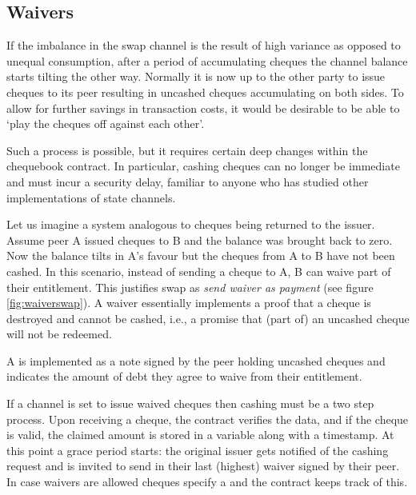 \subsection{Waivers}

If the imbalance in the swap channel is the result of high variance as opposed to unequal consumption, after a period of accumulating cheques the channel balance starts tilting the other way. Normally it is now up to the other party to issue cheques to its peer resulting in uncashed cheques accumulating on both sides.
To allow for further savings in transaction costs, it would be desirable to be able to `play the cheques off against each other'.

Such a process is possible, but it requires certain deep changes within the chequebook contract. In particular, cashing cheques can no longer be immediate and must incur a security delay, familiar to anyone who has studied other implementations of state channels.

Let us imagine a system analogous to cheques being returned to the issuer.  
Assume peer A issued cheques to B and the balance was brought back to zero. Now the balance tilts in A's favour but the cheques from A to B have not been cashed. In this scenario, instead of sending a cheque to A, B can waive part of their entitlement. This justifies swap as \emph{send waiver as payment} (see figure \ref{fig:waiverswap}).
A waiver essentially implements a proof that a cheque is destroyed and cannot be cashed, i.e., a promise that (part of) an uncashed cheque will not be redeemed.

A  is implemented as a note signed by the peer holding uncashed cheques %
 and indicates the amount of debt they agree to waive from their entitlement.

If a channel is set to issue waived cheques then cashing must be a two step process.
Upon receiving a cheque, the contract verifies the data, and %
if the cheque is valid, the claimed amount is stored in a variable along with a timestamp. At this point a grace period starts: the original issuer gets notified of the cashing request and is invited to send in their last (highest) waiver signed by their peer. In case waivers are allowed cheques specify a  and the contract keeps track of this.


